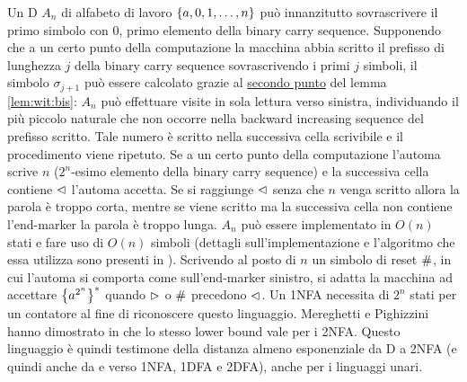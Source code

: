 Un D $A_n$ di alfabeto di lavoro $\left\{ a,0,1,\dots,n \right\}$ può innanzitutto sovrascrivere il primo simbolo con $0$, primo elemento della binary carry sequence. Supponendo che a un certo punto della computazione la macchina abbia scritto il prefisso di lunghezza $j$ della binary carry sequence sovrascrivendo i primi $j$ simboli, il simbolo $\sigma_{j+1}$ può essere calcolato grazie al \hyperref[lem:wit:bis:2]{secondo punto} del lemma \ref{lem:wit:bis}: $A_n$ può effettuare visite in sola lettura verso sinistra, individuando il più piccolo naturale che non occorre nella backward increasing sequence del prefisso scritto. Tale numero è scritto nella successiva cella scrivibile e il procedimento viene ripetuto. Se a un certo punto della computazione l'automa scrive $n$ ($2^n$-esimo elemento della binary carry sequence) e la successiva cella contiene $\lhd$ l'automa accetta. Se si raggiunge $\lhd$ senza che $n$ venga scritto allora la parola è troppo corta, mentre se viene scritto ma la successiva cella non contiene l'end-marker la parola è troppo lunga. $A_n$ può essere implementato in $O(n)$ stati e fare uso di $O(n)$ simboli (dettagli sull'implementazione e l'algoritmo che essa utilizza sono presenti in \cite{Pighizzini:19:limitedunary}). Scrivendo al posto di $n$ un simbolo di reset $\#$, in cui l'automa si comporta come sull'end-marker sinistro, si adatta la macchina ad accettare $\left\{ a^{2^n} \right\}^*$ quando $\rhd$ o $\#$ precedono $\lhd$. Un 1NFA necessita di $2^n$ stati per un contatore al fine di riconoscere questo linguaggio. Mereghetti e Pighizzini hanno dimostrato in \cite{Mereghetti:00:twoway} che lo stesso lower bound vale per i 2NFA. Questo linguaggio è quindi testimone della distanza almeno esponenziale da D a 2NFA (e quindi anche da  e verso 1NFA, 1DFA e 2DFA), anche per i linguaggi unari.

